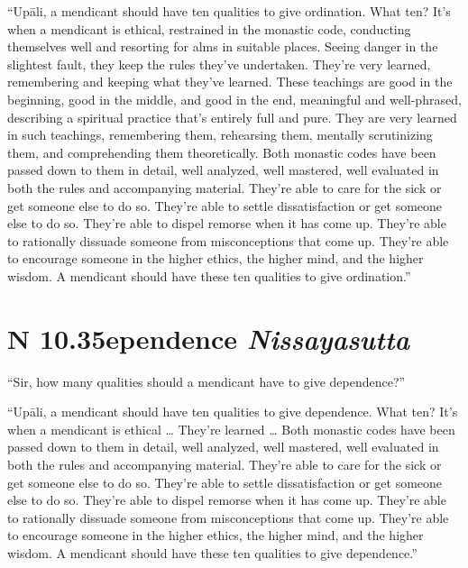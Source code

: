 \documentclass[12pt,openany]{book}%
\newcommand*{\suttatitleacronym}[1]{\smaller[2]{#1}\vspace*{.3em}}
\newcommand*{\suttatitletranslation}[1]{\linebreak{#1}}
\newcommand*{\suttatitleroot}[1]{\linebreak\smaller[2]\itshape{#1}}
\newcommand*{\tocacronym}[1]{\hspace*{-3.3em}{#1}\quad}
\newcommand*{\toctranslation}[1]{#1}
\newcommand*{\tocroot}[1]{(\textit{#1})}
\begin{document}
“\textsanskrit{Upāli}, a mendicant should have ten qualities to give ordination. What ten? It’s when a mendicant is ethical, restrained in the monastic code, conducting themselves well and resorting for alms in suitable places. Seeing danger in the slightest fault, they keep the rules they’ve undertaken. They’re very learned, remembering and keeping what they’ve learned. These teachings are good in the beginning, good in the middle, and good in the end, meaningful and well-phrased, describing a spiritual practice that’s entirely full and pure. They are very learned in such teachings, remembering them, rehearsing them, mentally scrutinizing them, and comprehending them theoretically. Both monastic codes have been passed down to them in detail, well analyzed, well mastered, well evaluated in both the rules and accompanying material. They’re able to care for the sick or get someone else to do so. They’re able to settle dissatisfaction or get someone else to do so. They’re able to dispel remorse when it has come up. They’re able to rationally dissuade someone from misconceptions that come up. They’re able to encourage someone in the higher ethics, the higher mind, and the higher wisdom. A mendicant should have these ten qualities to give ordination.” 

%
\section*{{\suttatitleacronym AN 10.35}{\suttatitletranslation Dependence }{\suttatitleroot Nissayasutta}}
\addcontentsline{toc}{section}{\tocacronym{AN 10.35} \toctranslation{Dependence } \tocroot{Nissayasutta}}

“Sir, how many qualities should a mendicant have to give dependence?” 

“\textsanskrit{Upāli}, a mendicant should have ten qualities to give dependence. What ten? It’s when a mendicant is ethical … They’re learned … Both monastic codes have been passed down to them in detail, well analyzed, well mastered, well evaluated in both the rules and accompanying material. They’re able to care for the sick or get someone else to do so. They’re able to settle dissatisfaction or get someone else to do so. They’re able to dispel remorse when it has come up. They’re able to rationally dissuade someone from misconceptions that come up. They’re able to encourage someone in the higher ethics, the higher mind, and the higher wisdom. A mendicant should have these ten qualities to give dependence.” 
\end{document}
